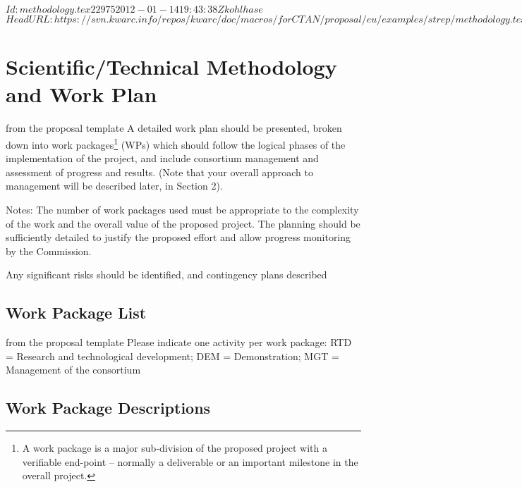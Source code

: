\svnInfo $Id: methodology.tex 22975 2012-01-14 19:43:38Z kohlhase $
\svnKeyword $HeadURL: https://svn.kwarc.info/repos/kwarc/doc/macros/forCTAN/proposal/eu/examples/strep/methodology.tex $
\section{Scientific/Technical Methodology and Work Plan}\label{sec:methodology}
\begin{todo}{from the proposal template}
  A detailed work plan should be presented, broken down into work packages\footnote{A work
    package is a major sub-division of the proposed project with a verifiable end-point –
    normally a deliverable or an important milestone in the overall project.} (WPs) which
  should follow the logical phases of the implementation of the project, and include
  consortium management and assessment of progress and results. (Note that your overall
  approach to management will be described later, in Section 2).

Notes: The number of work packages used must be appropriate to the complexity of the work
and the overall value of the proposed project. The planning should be sufficiently
detailed to justify the proposed effort and allow progress monitoring by the Commission.

Any significant risks should be identified, and contingency plans described
\end{todo}
\newpage

\newpage
\subsection{Work Package List}\label{sec:wplist}

\begin{todo}{from the proposal template}
Please indicate one activity per work package:
RTD = Research and technological development; DEM = Demonstration; MGT = Management of the consortium
\end{todo}

\wpfigstyle{\footnotesize}

\newpage
\newpage

\subsection{Work Package Descriptions}\label{sec:workpackages}
\begin{workplan}
\newpage
\newpage
\newpage
\newpage
\end{workplan}
\newpage



